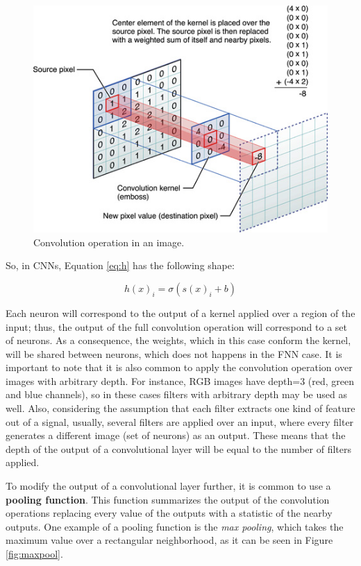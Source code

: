 \begin{figure}[H]
    \centering
    \includegraphics[width=0.4\linewidth]{imagenes/cap1/convolution.jpg}
    \caption{Convolution operation in an image.\protect\footnotemark}
    \label{fig:conv}
\end{figure}

So, in CNNs, Equation \ref{eq:h} has the following shape:

\begin{equation}
    h(x)_{i} = \sigma(s(x)_{i} + b)
    \label{eq:h2}
\end{equation}

Each neuron will correspond to the output of a kernel applied over a region of the input; thus, the output of the full convolution operation will correspond to a set of neurons. As a consequence, the weights, which in this case conform the kernel, will be shared between neurons, which does not happens in the FNN case. It is important to note that it is also common to apply the convolution operation over images with arbitrary depth. For instance, RGB images have depth=3 (red, green and blue channels), so in these cases filters with arbitrary depth may be used as well. Also, considering the assumption that each filter extracts one kind of feature out of a signal, usually, several filters are applied over an input, where every filter generates a different image (set of neurons) as an output. These means that the depth of the output of a convolutional layer will be equal to the number of filters applied.

To modify the output of a convolutional layer further, it is common to use a \textbf{pooling function}. This function summarizes the output of the convolution operations replacing every value of the outputs with a statistic of the nearby outputs. One example of a pooling function is the \emph{max pooling}, which takes the maximum value over a rectangular neighborhood, as it can be seen in Figure \ref{fig:maxpool}. 

